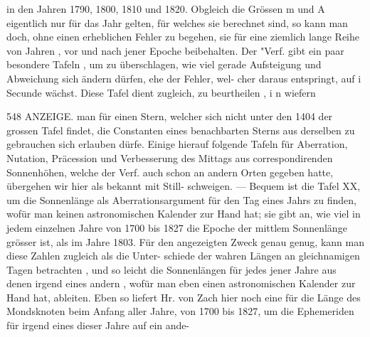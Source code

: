 \documentclass[12pt,a4paper]{article}
\begin{document}
in den Jahren 1790, 1800, 1810 und 1820.\newline
Obgleich die Grössen m und A eigentlich nur für das Jahr gelten, für welches sie berechnet\newline
sind, so kann man doch, ohne einen erheblichen Fehler zu begehen, sie für eine ziemlich lange Reihe\newline
von Jahren , vor und nach jener Epoche beibehalten. Der "Verf. gibt ein paar besondere Tafeln , um zu\newline
überschlagen, wie viel gerade Aufsteigung und Abweichung sich ändern dürfen, ehe der Fehler, wel-\newline
cher daraus entspringt, auf i Secunde wächst. Diese Tafel dient zugleich, zu beurtheilen , i n wiefern\newline

\newpage
548 ANZEIGE.\newline
man für einen Stern, welcher sich nicht unter den 1404 der grossen Tafel findet, die Constanten eines\newline
benachbarten Sterns aus derselben zu gebrauchen sich erlauben dürfe. Einige hierauf folgende Tafeln\newline
für Aberration, Nutation, Präcession und Verbesserung des Mittags aus correspondirenden Sonnenhöhen,\newline
welche der Verf. auch schon an andern Orten gegeben hatte, übergehen wir hier als bekannt mit Still-\newline
schweigen. --- Bequem ist die Tafel XX, um die Sonnenlänge als Aberrationsargument für den Tag\newline
eines Jahrs zu finden, wofür man keinen astronomischen Kalender zur Hand hat; sie gibt an, wie viel\newline
in jedem einzelnen Jahre von 1700 bis 1827 die Epoche der mittlem Sonnenlänge grösser ist, als im\newline
Jahre 1803. Für den angezeigten Zweck genau genug, kann man diese Zahlen zugleich als die Unter-\newline
schiede der wahren Längen an gleichnamigen Tagen betrachten , und so leicht die Sonnenlängen für\newline
jedes jener Jahre aus denen irgend eines andern , wofür man eben einen astronomischen Kalender zur\newline
Hand hat, ableiten. Eben so liefert Hr. von Zach hier noch eine für die Länge des Mondsknoten beim\newline
Anfang aller Jahre, von 1700 bis 1827, um die Ephemeriden für irgend eines dieser Jahre auf ein ande-\newline
\end{document}
